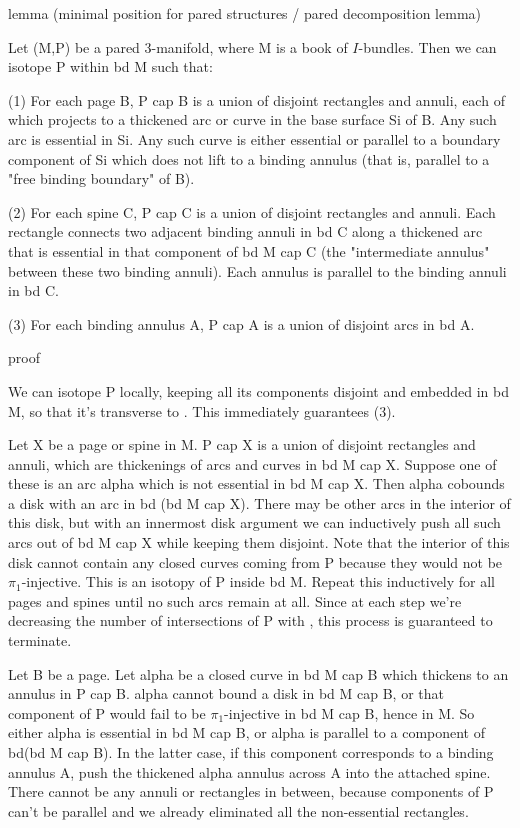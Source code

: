 lemma (minimal position for pared structures / pared decomposition lemma)

Let (M,P) be a pared 3-manifold, where M is a book of $I$-bundles. Then we can
isotope P within bd M such that:

(1) For each page B, P cap B is a union of disjoint rectangles and annuli, each
of which projects to a thickened arc or curve in the base surface Si of B. Any
such arc is essential in Si. Any such curve is either essential or parallel to
a boundary component of Si which does not lift to a binding annulus (that is,
parallel to a "free binding boundary" of B).

(2) For each spine C, P cap C is a union of disjoint rectangles and annuli.
Each rectangle connects two adjacent binding annuli in bd C along a thickened
arc that is essential in that component of bd M cap C (the "intermediate
annulus" between these two binding annuli). Each annulus is parallel to the
binding annuli in bd C.

(3) For each binding annulus A, P cap A is a union of disjoint arcs in bd A.

proof

We can isotope P locally, keeping all its components disjoint and embedded in
bd M, so that it's transverse to \cA. This immediately guarantees (3).

Let X be a page or spine in M. P cap X is a union of disjoint rectangles and
annuli, which are thickenings of arcs and curves in bd M cap X. Suppose one of
these is an arc alpha which is not essential in bd M cap X. Then alpha cobounds
a disk with an arc in bd (bd M cap X). There may be other arcs in the interior
of this disk, but with an innermost disk argument we can inductively push all
such arcs out of bd M cap X while keeping them disjoint. Note that the interior
of this disk cannot contain any closed curves coming from P because they would
not be $\pi_1$-injective. This is an isotopy of P inside bd M.  Repeat this
inductively for all pages and spines until no such arcs remain at all.  Since
at each step we're decreasing the number of intersections of P with \cA, this
process is guaranteed to terminate.

Let B be a page. Let alpha be a closed curve in bd M cap B which thickens to an
annulus in P cap B. alpha cannot bound a disk in bd M cap B, or that component
of P would fail to be $\pi_1$-injective in bd M cap B, hence in M. So either alpha
is essential in bd M cap B, or alpha is parallel to a component of bd(bd M cap
B). In the latter case, if this component corresponds to a binding annulus A,
push the thickened alpha annulus across A into the attached spine. There cannot
be any annuli or rectangles in between, because components of P can't be
parallel and we already eliminated all the non-essential rectangles.


